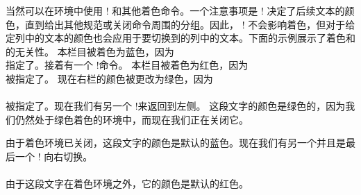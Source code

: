 当然可以在环境中使用 \!\color! 和其他着色命令。一个注意事项是 \!\color! 决定了后续文本的颜色，直到给出其他规范或关闭命令周围的分组。因此， \!\switchcolumn! 不会影响着色，但对于给定列中的文本的颜色也会应用于要切换到的列中的文本。下面的示例展示了着色和\cswitch{}的无关性。
% 
本栏目被着色为蓝色，因为\\
指定了。接着有一个 \!\switchcolumn!命令。
本栏目被着色为红色，因为\\
被指定了。
% 
现在右栏的颜色被更改为绿色，因为\\
\\被指定了。现在我们有另一个 \!\switchcolumn!来返回到左侧。
这段文字的颜色是绿色的，因为我们仍然处于绿色着色的环境中，而现在我们正在关闭它。\par
% 
由于着色环境已关闭，这段文字的颜色是默认的蓝色。现在我们有另一个并且是最后一个 \!\switchcolumn! 向右切换。\\\
\\由于这段文字在着色环境之外，它的颜色是默认的红色。
% 

